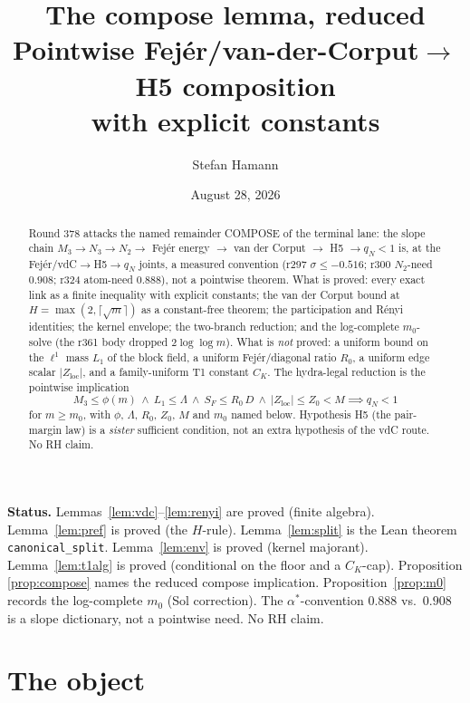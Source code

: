 \documentclass[11pt]{article}
\title{\bfseries The compose lemma, reduced\\[2mm]
\large Pointwise Fej\'er/van-der-Corput$\to$H5 composition\\
with explicit constants}
\author{Stefan Hamann}
\date{August 28, 2026}
\theoremstyle{remark}
\newcommand{\loc}{\mathrm{loc}}
\begin{document}
\maketitle

\begin{abstract}\noindent
Round 378 attacks the named remainder COMPOSE of the terminal
lane: the slope chain
$M_3\to N_3\to N_2\to$ Fej\'er energy $\to$ van der Corput
$\to$ H5 $\to q_N<1$ is, at the Fej\'er/vdC$\to$H5$\to q_N$
joints, a measured convention (r297 $\sigma\le-0.516$; r300
$N_2$-need $0.908$; r324 atom-need $0.888$), not a pointwise
theorem.  What is proved: every exact link as a finite inequality
with explicit constants; the van der Corput bound at
$H=\max(2,\lceil\sqrt{m}\rceil)$ as a constant-free theorem;
the participation and R\'enyi identities; the kernel envelope;
the two-branch reduction; and the log-complete $m_0$-solve
(the r361 body dropped $2\log\log m$).  What is \emph{not}
proved: a uniform bound on the $\ell^1$ mass $L_1$ of the
block field, a uniform Fej\'er/diagonal ratio $R_0$, a uniform
edge scalar $|Z_{\loc}|$, and a family-uniform T1 constant
$C_K$.  The hydra-legal reduction is the pointwise implication
\[
  M_3\le\phi(m)\ \wedge\ L_1\le\Lambda\ \wedge\ S_F\le R_0\,D
  \ \wedge\ |Z_{\loc}|\le Z_0<M
  \implies q_N<1
\]
for $m\ge m_0$, with $\phi$, $\Lambda$, $R_0$, $Z_0$, $M$ and
$m_0$ named below.  Hypothesis H5 (the pair-margin law) is a
\emph{sister} sufficient condition, not an extra hypothesis of
the vdC route.  No RH claim.
\end{abstract}

\medskip\noindent
\textbf{Status.}\enspace
Lemmas~\ref{lem:vdc}--\ref{lem:renyi} are proved (finite
algebra).  Lemma~\ref{lem:pref} is proved (the $H$-rule).
Lemma~\ref{lem:split} is the Lean theorem
\texttt{canonical\_split}.  Lemma~\ref{lem:env} is proved
(kernel majorant).  Lemma~\ref{lem:t1alg} is proved
(conditional on the floor and a $C_K$-cap).  Proposition
\ref{prop:compose} names the reduced compose implication.
Proposition~\ref{prop:m0} records the log-complete $m_0$
(Sol correction).  The $\alpha^*$-convention $0.888$ vs.\
$0.908$ is a slope dictionary, not a pointwise need.
No RH claim.

\section{The object}\label{sec:obj}
\end{document}
